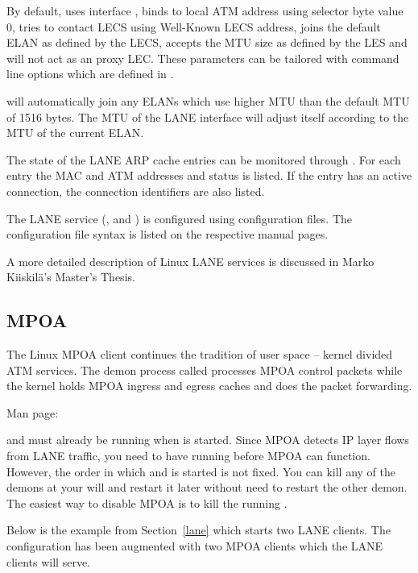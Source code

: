 By default,  uses interface , binds to local
ATM address using selector byte value 0, tries to contact LECS using
Well-Known LECS address, joins the default ELAN as defined by the
LECS, accepts the MTU size as defined by the LES and will not act as
an proxy LEC. These parameters can be tailored with command line
options which are defined in .

 will automatically join any ELANs which use higher
MTU than the default MTU of 1516 bytes. The MTU of the LANE
interface will adjust itself according to the MTU of the current
ELAN.

The state of the LANE ARP cache entries can be monitored through
. For each entry the MAC and ATM addresses and status 
is listed. If the entry has an active connection, the connection
identifiers are also listed.

The LANE service (,  and ) is
configured using configuration files. The configuration file syntax is
listed on the respective manual pages.

A more detailed description of Linux LANE services is discussed in
Marko Kiiskil\"a's Master's Thesis.~\cite{kiis}


\subsection{MPOA}
\label{mpoa}

The Linux MPOA client continues the tradition of user space -- kernel
divided ATM services. The demon process called  processes
MPOA control packets while the kernel holds MPOA ingress and egress
caches and does the packet forwarding.

Man page: 

 and  must already be running when
 is started. Since MPOA detects IP layer flows from LANE
traffic, you need to have  running before MPOA can
function. However, the order in which  and 
is started is not fixed. You can kill any of the demons at your will
and restart it later without need to restart the other demon. The
easiest way to disable MPOA is to kill the running .

Below is the example from Section~\ref{lane} which starts two LANE
clients. The configuration has been augmented with two MPOA clients
which the LANE clients will serve.

